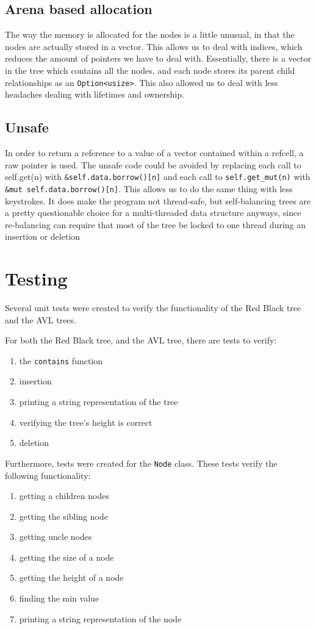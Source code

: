 \documentclass[letterpaper]{article}
\begin{document}
\subsection{Arena based allocation}
The way the memory is allocated for the nodes is a little unusual, in that the
nodes are actually stored in a vector. This allows us to deal with indices,
which reduces the amount of pointers we have to deal with. Essentially, there is
a vector in the tree which contains all the nodes, and each node stores its
parent child relationships as an \texttt{Option<usize>}. This also allowed us to
deal with less headaches dealing with lifetimes and ownership.

\subsection{Unsafe}
In order to return a reference to a value of a vector contained within a
refcell, a raw pointer is used. The unsafe code could be avoided by replacing
each call to self.get(n) with \texttt{\&self.data.borrow()[n]} and each call to
\texttt{self.get\_mut(n)} with \texttt{\&mut self.data.borrow()[n]}. This allows
us to do the same thing with less keystrokes. It does make the program not
thread-safe, but self-balancing trees are a pretty questionable choice for a
multi-threaded data structure anyways, since re-balancing can require that most
of the tree be locked to one thread during an insertion or deletion

\section{Testing}
Several unit tests were created to verify the functionality of the Red Black
tree and the AVL trees. 

For both the Red Black tree, and the AVL tree, there are tests to verify:
\begin{enumerate}
  \item the \texttt{contains} function
  \item insertion
  \item printing a string representation of the tree
  \item verifying the tree's height is correct
  \item deletion
\end{enumerate}

Furthermore, tests were created for the \texttt{Node} class. These tests verify
the following functionality:
\begin{enumerate}
  \item getting a children nodes
  \item getting the sibling node
  \item getting uncle nodes
  \item getting the size of a node
  \item getting the height of a node
  \item finding the min value
  \item printing a string representation of the node
\end{enumerate}
\end{document}
